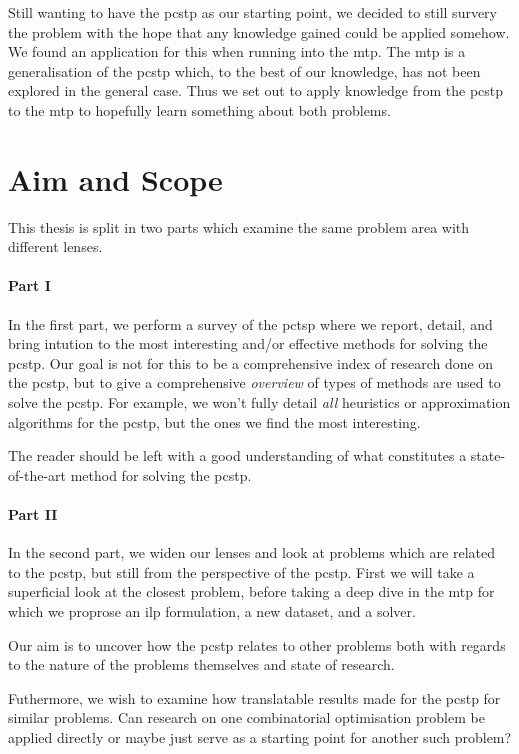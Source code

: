 Still wanting to have the \gls{pcstp} as our starting point, we decided to still survery the
problem with the hope that any knowledge gained could be applied somehow. We found an application
for this when running into the \gls{mtp}. The \gls{mtp} is a generalisation of the \gls{pcstp}
which, to the best of our knowledge, has not been explored in the general case. Thus we set out
to apply knowledge from the \gls{pcstp} to the \gls{mtp} to hopefully learn something about
both problems.
\section{Aim and Scope}
This thesis is split in two parts which examine the same problem area with different lenses.
\paragraph{Part I}

In the first part, we perform a
survey of the \acrlong{pctsp} where we report, detail, and bring intution to the most interesting
and/or effective methods for solving the \gls{pcstp}.
Our goal is not for this to be a comprehensive index
of research done on the \gls{pcstp}, but to give a comprehensive \textit{overview} of
types of methods are used to solve the \gls{pcstp}. For example, we won't fully detail \textit{all}
heuristics or approximation algorithms for the \gls{pcstp}, but the ones we find the most interesting.

The reader should be left with a good understanding of
what constitutes a state-of-the-art method for solving the \gls{pcstp}.

\paragraph{Part II}

In the second part, we widen our lenses and look at problems which are related to the \gls{pcstp},
but still from the perspective of
the \gls{pcstp}.
First we will take a superficial look at the closest problem,
before taking a deep dive in the \acrlong{mtp} for which
we proprose an \gls{ilp} formulation, a new dataset, and a solver.

Our aim is to uncover how the \gls{pcstp} relates to other problems
both with regards to the nature of the problems themselves and state of
research.

Futhermore, we wish to examine how translatable results made for the \gls{pcstp} for similar problems.
Can research on one combinatorial optimisation problem be applied directly or maybe just serve as a
starting point for another such problem?

